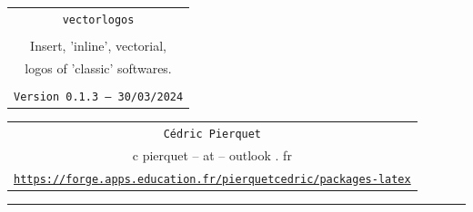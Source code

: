 \documentclass[11pt,a4paper]{ltxdoc}
\def\TPversion{0.1.3}
\def\TPdate{30/03/2024}
\begin{document}
\pagestyle{fancy}

\thispagestyle{empty}

\begin{center}
	\begin{minipage}{0.88\linewidth}
	\begin{tcolorbox}[colframe=yellow,colback=yellow!15]
		\begin{center}
			\begin{tabular}{c}
				{\Huge \texttt{vectorlogos}}\\
				\\
				{\LARGE Insert, 'inline', vectorial,} \\
				{\LARGE logos of 'classic' softwares.} \\
				\\
				{\small \texttt{Version \TPversion{} -- \TPdate}}
		\end{tabular}
		\end{center}
	\end{tcolorbox}
\end{minipage}
\end{center}

\begin{center}
	\begin{tabular}{c}
	\texttt{Cédric Pierquet}\\
	{\ttfamily c pierquet -- at -- outlook . fr}\\
	\texttt{\url{https://forge.apps.education.fr/pierquetcedric/packages-latex}} \\
\end{tabular}
\end{center}

\hrule

\vfill
\end{document}
